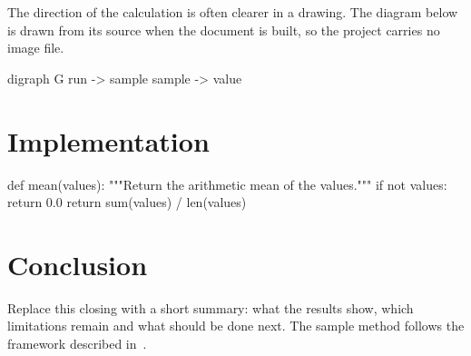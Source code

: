 The direction of the calculation is often clearer in a drawing. The diagram
below is drawn from its source when the document is built, so the project
carries no image file.
\begin{graphviz}[style=editorial, pos=H, width=0.62\linewidth, caption={From a measured run to its reported value}]
  digraph G {
    run -> sample
    sample -> value
  }
\end{graphviz}

\section{Implementation}
\begin{code}[lang=python]
def mean(values):
    """Return the arithmetic mean of the values."""
    if not values:
        return 0.0
    return sum(values) / len(values)
\end{code}

\section{Conclusion}
Replace this closing with a short summary: what the results show, which
limitations remain and what should be done next. The sample method follows
the framework described in~\cite{example}.
